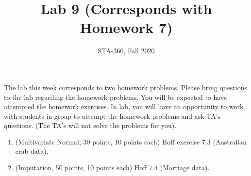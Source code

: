 \documentclass{article}
\begin{document}
\title{Lab 9 (Corresponds with Homework 7)}
\author{STA-360, Fall 2020}
\date{}
\maketitle

The lab this week corresponds to two homework problems. Please bring questions to the lab regarding the homework problems. You will be expected to have attempted the homework exercises. In lab, you will have an opportunity to work with students in group to attempt the homework problems and ask TA's questions. (The TA's will not solve the problems for you). 

\begin{enumerate}
\item (Multivariate Normal, 30 points, 10 points each) Hoff exercise 7.3 (Australian crab data).
\item (Imputation, 50 points, 10 points each) Hoff 7.4 (Marriage data).
\end{enumerate}
\end{document}

